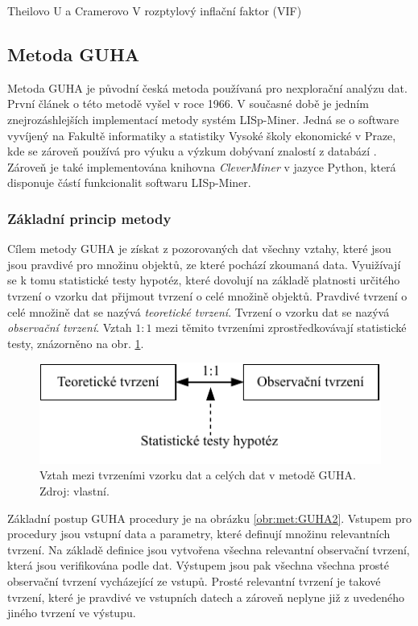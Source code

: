 \newpage
Theilovo U a Cramerovo V
rozptylový inflační faktor (VIF)

\subsection{Metoda GUHA}
\label{sec:Teorie:Guha}

Metoda GUHA je původní česká metoda používaná pro nexplorační analýzu dat.
První článek o této metodě vyšel v roce 1966. V současné době je jedním znejrozáshlejších implementací metody systém LISp-Miner. Jedná se o software vyvíjený na Fakultě informatiky a statistiky Vysoké školy ekonomické v Praze, kde se zároveň používá pro výuku a výzkum dobývaní znalostí z databází \cite{bib:GUHA}. Zároveň je také implementována knihovna \emph{CleverMiner} v jazyce Python, která disponuje částí funkcionalit softwaru LISp-Miner.

\subsubsection{Základní princip metody}

Cílem metody GUHA je získat z pozorovaných dat všechny vztahy, které jsou jsou pravdivé pro množinu objektů, ze které pochází zkoumaná data. Vyuižívají se k tomu statistické testy hypotéz, které dovolují na základě platnosti určitého tvrzení o vzorku dat přijmout tvrzení o celé množině objektů. Pravdivé tvrzení o celé množině dat se nazývá \emph{teoretické tvrzení}. Tvrzení o vzorku dat se nazývá \emph{observační tvrzení}. Vztah $1:1$ mezi těmito tvrzeními zprostředkovávají statistické testy, znázorněno na obr. \ref*{obr:met:GUHA1}.\cite{bib:GUHA}

\begin{figure}[hbtp!]
    \centering
    \captionsetup{justification=centering}
    \includegraphics[width=.5\textwidth]{obrazky/GUHA/GUHA1.pdf}
    \caption{Vztah mezi tvrzeními vzorku dat a celých dat v metodě GUHA. Zdroj: vlastní.}
    \label{obr:met:GUHA1}
\end{figure}

Základní postup GUHA procedury je na obrázku \ref*{obr:met:GUHA2}. Vstupem pro procedury jsou vstupní data a parametry, které definují množinu relevantních tvrzení. Na základě definice jsou vytvořena všechna relevantní observační tvrzení, která jsou verifikována podle dat. Výstupem jsou pak všechna všechna prosté observační tvrzení vycházející ze vstupů. Prosté relevantní  tvrzení je takové tvrzení, které je pravdivé ve vstupních datech a zároveň neplyne již z uvedeného jiného tvrzení ve výstupu.\cite{bib:GUHA}

